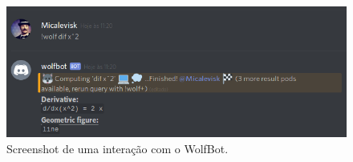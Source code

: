 \begin{figure}[h!tbp]
    \centering
    \includegraphics[width=0.9\linewidth]{img/bot5_1.png}
    \caption{Screenshot de uma interação com o WolfBot.}
    \label{fig:bot5_1}
\end{figure}